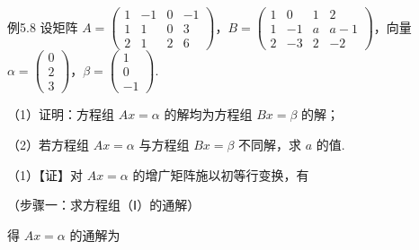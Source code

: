 \begin{fcard}{例5.8}
设矩阵 $A=\begin{pmatrix}1&-1&0&-1\\1&1&0&3\\2&1&2&6\end{pmatrix}$，$B=\begin{pmatrix}1&0&1&2\\1&-1&a&a-1\\2&-3&2&-2\end{pmatrix}$，向量 $\alpha=\begin{pmatrix}0\\2\\3\end{pmatrix}$，$\beta=\begin{pmatrix}1\\0\\-1\end{pmatrix}$.

（1）证明：方程组 $Ax=\alpha$ 的解均为方程组 $Bx=\beta$ 的解；

（2）若方程组 $Ax=\alpha$ 与方程组 $Bx=\beta$ 不同解，求 $a$ 的值.

（1）【证】对 $Ax=\alpha$ 的增广矩阵施以初等行变换，有


（步骤一：求方程组（Ⅰ）的通解）

得 $Ax=\alpha$ 的通解为



\end{fcard}
